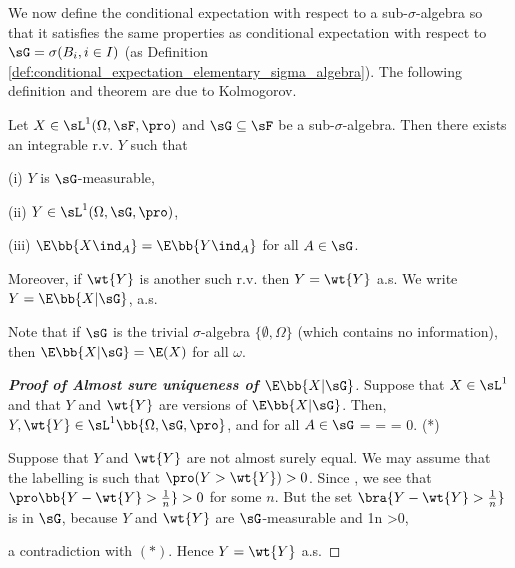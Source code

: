 We now define the conditional expectation with respect to a sub-$\sigma$-algebra so that it satisfies the same properties as conditional expectation with respect to $\sG = \sigma(B_i , i \in I)$ (as Definition \ref{def:conditional_expectation_elementary_sigma_algebra}). The following definition and theorem are due to Kolmogorov.

\begin{theorem}\label{thm:conditional_expectation_existence_uniqueness}
Let $X \in \sL^1(\Omega,\sF,\pro)$ and $\sG \subseteq \sF$ be a sub-$\sigma$-algebra. Then there exists an integrable r.v. $Y$ such that
\ben
\item [(i)] $Y$ is $\sG$-measurable,
\item [(ii)] $Y \in \sL^1(\Omega,\sG,\pro)$,
\item [(iii)] $\E\bb{X\ind_A} = \E\bb{Y\ind_A}$ for all $A \in \sG$.
\een

Moreover, if $\wt{Y}$ is another such r.v. then $Y = \wt{Y}$ a.s. We write $Y = \E\bb{X|\sG}$, a.s.
\end{theorem}

\begin{remark}
Note that if $\sG$ is the trivial $\sigma$-algebra $\{\emptyset, \Omega\}$ (which contains no information), then $\E\bb{X|\sG} = \E(X)$ for all $\omega$.
\end{remark}

\begin{proof}[\bf Proof of Almost sure uniqueness of $\E\bb{X|\sG}$]
Suppose that $X\in \sL^1$ and that $Y$ and $\wt{Y}$ are versions of $\E\bb{X|\sG}$. Then, $Y,\wt{Y} \in \sL^1\bb{\Omega,\sG,\pro}$, and for all $A\in \sG$
\be
\E {} = \E {} = \E {}\quad\ra\quad \E{} = 0. \quad (*)\quad {}
\ee

Suppose that $Y$ and $\wt{Y}$ are not almost surely equal. We may assume that the labelling is such that $\pro(Y>\wt{Y}) >0$. Since
\be
{} \ua {},
\ee
we see that $\pro\bb{Y-\wt{Y} > \frac 1n} >0$ for some $n$. But the set $\bra{Y-\wt{Y}> \frac 1n}$ is in $\sG$, because $Y$ and $\wt{Y}$ are $\sG$-measurable and
\be
\E{} \geq \frac 1n \pro{} >0,
\ee

a contradiction with $(*)$. Hence $Y=\wt{Y}$ a.s.
\end{proof}

